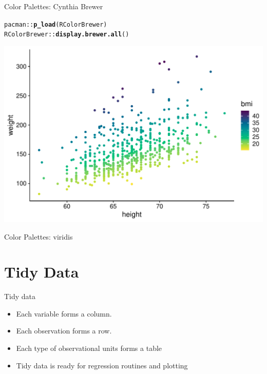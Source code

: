\documentclass[10pt,handout]{beamer}\usepackage[]{graphicx}\usepackage[]{color}
\makeatletter
\def\maxwidth{ %
  \ifdim\Gin@nat@width>\linewidth
    \linewidth
  \else
    \Gin@nat@width
  \fi
}
\newcommand{\hlopt}[1]{\textcolor[rgb]{0,0,0}{#1}}%
\newcommand{\hlstd}[1]{\textcolor[rgb]{0.345,0.345,0.345}{#1}}%
\newcommand{\hlkwd}[1]{\textcolor[rgb]{0.737,0.353,0.396}{\textbf{#1}}}%
\newenvironment{kframe}{%
 \def\at@end@of@kframe{}%
 \ifinner\ifhmode%
  \def\at@end@of@kframe{\end{minipage}}%
  \begin{minipage}{\columnwidth}%
 \fi\fi%
 \def\FrameCommand##1{\hskip\@totalleftmargin \hskip-\fboxsep
 \colorbox{shadecolor}{##1}\hskip-\fboxsep
     \hskip-\linewidth \hskip-\@totalleftmargin \hskip\columnwidth}%
 \MakeFramed {\advance\hsize-\width
   \@totalleftmargin\z@ \linewidth\hsize
   \@setminipage}}%
 {\par\unskip\endMakeFramed%
 \at@end@of@kframe}
\newenvironment{knitrout}{}{} %
\makeatother
\begin{document}
\begin{frame}[fragile]{Color Palettes: Cynthia Brewer}
	
\begin{knitrout}\tiny
{}\color{fgcolor}\begin{kframe}
\begin{alltt}
\hlstd{pacman}\hlopt{::}\hlkwd{p_load}\hlstd{(RColorBrewer)}
\hlstd{RColorBrewer}\hlopt{::}\hlkwd{display.brewer.all}\hlstd{()}
\end{alltt}
\end{kframe}

{\centering \includegraphics[width=\maxwidth]{figure/unnamed-chunk-4-1} 

}



\end{knitrout}
	
	
\end{frame}



\begin{frame}[fragile]{Color Palettes: viridis}
	
	
	
	
	
\end{frame}

\section{Tidy Data}

\begin{frame}{Tidy data}
	
	\begin{itemize}
		\setlength\itemsep{.51em}
		\item Each variable forms a column.
		\item Each observation forms a row.
		\item Each type of observational units forms a table
		\item Tidy data is ready for regression routines and plotting
	\end{itemize}
	
	
	
\end{frame}
\end{document}
